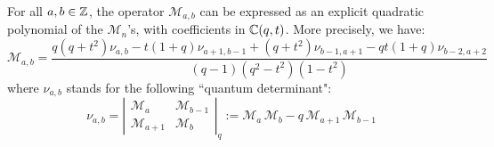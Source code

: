 \begin{thm}\label{polynomialitythm}
For all $a,b\in {\mathbb Z}$, the operator ${\mathcal M}_{a,b}$ can be expressed as an explicit quadratic polynomial of the 
${\mathcal M}_{n}$'s, with coefficients in ${\mathbb C}(q,t)$. More precisely, we have:
\begin{equation}\label{mtwopol}
{\mathcal M}_{a,b}=\frac{q(q+t^2)\nu_{a,b}-t(1+q) \nu_{a+1,b-1}+(q+t^2)\nu_{b-1,a+1}
-q t(1+q) \nu_{b-2,a+2}}{(q-1)(q^2-t^2)(1-t^2)}
\end{equation}
where $\nu_{a,b}$ stands for the following ``quantum determinant":
\begin{equation}\label{qdetwo}
\nu_{a,b}=\left\vert
\begin{matrix}
{\mathcal M}_a & {\mathcal M}_{b-1}\\
{\mathcal M}_{a+1} & {\mathcal M}_{b}
\end{matrix} \right\vert_q:={\mathcal M}_a\, {\mathcal M}_b- q\, {\mathcal M}_{a+1}\, {\mathcal M}_{b-1}
\end{equation}
\end{thm}
